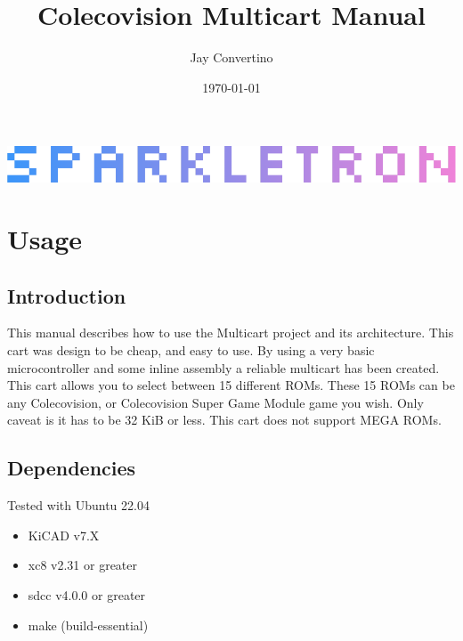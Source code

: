 \documentclass{article}
\title{{\Huge Colecovision Multicart Manual}}
\author{\Large Jay Convertino}
\date{\today}
\begin{document}
  \begin{titlepage}
    \begin{center}

    \thetitle

    \vspace{25mm}

    \includegraphics[width=\textwidth,height=\textheight,keepaspectratio]{src/img/SPARKLETRON.png}

    \vspace{25mm}

    \thedate

    \vspace{15mm}

    \theauthor

    \end{center}
  \end{titlepage}

  \tableofcontents

  \newpage

  \section{Usage}

  \subsection{Introduction}

  \par
  This manual describes how to use the Multicart project and its architecture. This cart was design to be cheap, and easy to use.
  By using a very basic microcontroller and some inline assembly a reliable multicart has been created. This cart allows you to
  select between 15 different ROMs. These 15 ROMs can be any Colecovision, or Colecovision Super Game Module game you wish. Only
  caveat is it has to be 32 KiB or less. This cart does not support MEGA ROMs.

  \subsection{Dependencies}

  \par
  Tested with Ubuntu 22.04

  \begin{itemize}
    \item KiCAD v7.X
    \item xc8 v2.31 or greater
    \item sdcc v4.0.0 or greater
    \item make (build-essential)
  \end{itemize}
\end{document}
